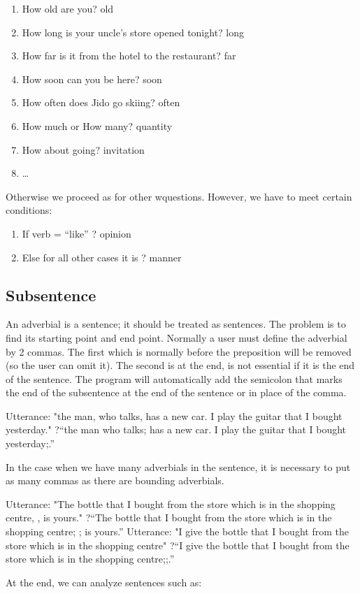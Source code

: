 \documentclass[twoside,a4paper,10pt]{report}
\begin{document}
\begin{enumerate}    \item  How old are you? old
    \item  How long is your uncle's store opened tonight? long
    \item  How far is it from the hotel to the restaurant? far 
    \item  How soon can you be here? soon
    \item  How often does Jido go skiing? often
    \item  How much or How many? quantity
    \item  How about going? invitation
    \item  \ldots{}
\end{enumerate}
Otherwise we proceed as for other w{\textunderscore}questions. However, we have to meet certain conditions:


\begin{enumerate}    \item  If verb = “like” ? opinion
    \item  Else for all other cases it is ? manner
\end{enumerate}

\subsection{Subsentence}
\label{60550ca08c44dda94b3d7a018a352868}%
An adverbial is a sentence; it should be treated as sentences. The problem is to find its starting point and end point.
Normally a user must define the adverbial by 2 commas. The first which is normally before the preposition will be removed (so the user can omit it). The second is at the end, is not essential if it is the end of the sentence. The program will automatically add the semicolon that marks the end of the subsentence at the end of the sentence or in place of the comma. 


\small
\begin{verbatimtab}
  Utterance: "the man, who talks, has a new car. I play the guitar that I bought yesterday."
  ?“the man who talks; has a new car. I play the guitar that I bought yesterday;.”
\end{verbatimtab}
\normalsize
In the case when we have many adverbials in the sentence, it is necessary to put as many commas as there are bounding adverbials.


\small
\begin{verbatimtab}
  Utterance: "The bottle that I bought from the store which is in the shopping centre, , is yours."
  ?“The bottle that I bought from the store which is in the shopping centre; ; is yours.”
  Utterance: "I give the bottle that I bought from the store which is in the shopping centre"
  ?“I give the bottle that I bought from the store which is in the shopping centre;;.” 
\end{verbatimtab}
\normalsize
At the end, we can analyze sentences such as:
\end{document}
